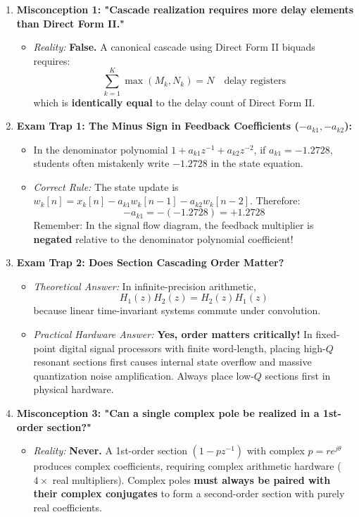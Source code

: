 \documentclass[11pt,a4paper]{article}
\begin{document}
\begin{enumerate}
    \item \textbf{Misconception 1: "Cascade realization requires more delay elements than Direct Form II."}
    \begin{itemize}
        \item \textit{Reality:} \textbf{False.} A canonical cascade using Direct Form II biquads requires:
        \begin{equation*}
        \sum_{k=1}^K \max(M_k, N_k) = N \quad \text{delay registers}
        \end{equation*}
        which is \textbf{identically equal} to the delay count of Direct Form II.
    \end{itemize}

    \item \textbf{Exam Trap 1: The Minus Sign in Feedback Coefficients ($-a_{k1}, -a_{k2}$):}
    \begin{itemize}
        \item In the denominator polynomial $1 + a_{k1} z^{-1} + a_{k2} z^{-2}$, if $a_{k1} = -1.2728$, students often mistakenly write $-1.2728$ in the state equation.
        \item \textit{Correct Rule:} The state update is $w_k[n] = x_k[n] - a_{k1} w_k[n-1] - a_{k2} w_k[n-2]$. Therefore:
        $$-a_{k1} = -(-1.2728) = \mathbf{+1.2728}$$
        Remember: In the signal flow diagram, the feedback multiplier is \textbf{negated} relative to the denominator polynomial coefficient!
    \end{itemize}

    \item \textbf{Exam Trap 2: Does Section Cascading Order Matter?}
    \begin{itemize}
        \item \textit{Theoretical Answer:} In infinite-precision arithmetic,
        \begin{equation*}
        H_1(z) H_2(z) = H_2(z) H_1(z)
        \end{equation*}
        because linear time-invariant systems commute under convolution.
        \item \textit{Practical Hardware Answer:} \textbf{Yes, order matters critically!} In fixed-point digital signal processors with finite word-length, placing high-$Q$ resonant sections first causes internal state overflow and massive quantization noise amplification. Always place low-$Q$ sections first in physical hardware.
    \end{itemize}

    \item \textbf{Misconception 3: "Can a single complex pole be realized in a 1st-order section?"}
    \begin{itemize}
        \item \textit{Reality:} \textbf{Never.} A 1st-order section $(1 - p z^{-1})$ with complex $p = r e^{j\theta}$ produces complex coefficients, requiring complex arithmetic hardware ($4\times$ real multipliers). Complex poles \textbf{must always be paired with their complex conjugates} to form a second-order section with purely real coefficients.
    \end{itemize}
\end{enumerate}
\end{document}
